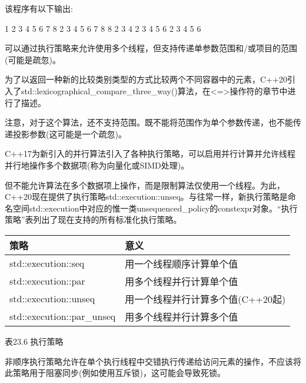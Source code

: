 该程序有以下输出:

\begin{shell}
1 2 3 4 5 6 7 8
2 3 4 5 6 7 8 8
2 3 4 2 3 4 5 6
2 3 4 5 6
\end{shell}

可以通过执行策略来允许使用多个线程，但支持传递单参数范围和/或项目的范围(可能是疏忽)。


为了以返回一种新的比较类别类型的方式比较两个不同容器中的元素，C++20引入了std::lexicographical\_compare\_three\_way()算法，在<=>操作符的章节中进行了描述。

注意，对于这个算法，还不支持范围。既不能将范围作为单个参数传递，也不能传递投影参数(这可能是一个疏忽)。


C++17为新引入的并行算法引入了各种执行策略，可以启用并行计算并允许线程并行地操作多个数据项(称为向量化或SIMD处理)。

但不能允许算法在多个数据项上操作，而是限制算法仅使用一个线程。为此，C++20现在提供了执行策略std::execution::unseq。与往常一样，新执行策略是命名空间std::execution中对应的惟一类unsequenced\_policy的constexpr对象。“执行策略”表列出了现在支持的所有标准化执行策略。


\begin{longtable}[c]{|l|l|}
\hline
\textbf{策略}     & \textbf{意义}                                           \\ \hline
\endfirsthead
%
\endhead
%
std::execution::seq & 用一个线程顺序计算单个值     \\ \hline
std::execution::par & 用多个线程并行计算单个值 \\ \hline
std::execution::unseq      & 用一个线程并行计算多个值(C++20起) \\ \hline
std::execution::par\_unseq & 用多个线程并行计算多个值        \\ \hline
\end{longtable}

\begin{center}
表23.6 执行策略
\end{center}

非顺序执行策略允许在单个执行线程中交错执行传递给访问元素的操作，不应该将此策略用于阻塞同步(例如使用互斥锁)，这可能会导致死锁。

